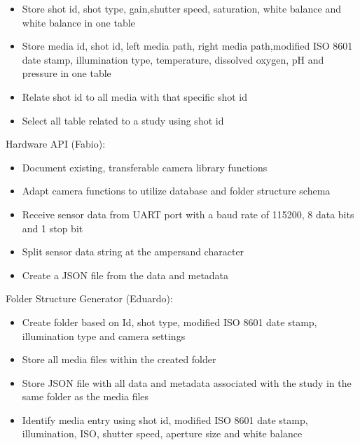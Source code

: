 \begin{itemize}
	\item Store shot id, shot type, gain,shutter speed, saturation, white balance and white balance in one table
	\item Store media id, shot id, left media path, right media path,modified ISO 8601 date stamp, illumination type, temperature, dissolved oxygen, pH and pressure in one table
	\item Relate shot id to all media with that specific shot id
	\item Select all table related to a study using shot id
\end{itemize}
Hardware API (Fabio):
\begin{itemize}
	\item Document existing, transferable camera library functions
	\item Adapt camera functions to utilize database and folder structure schema
	\item Receive sensor data from UART port with a baud rate of 115200, 8 data bits and 1 stop bit
	\item Split sensor data string at the ampersand character
	\item Create a JSON file from the data and metadata
\end{itemize}
Folder Structure Generator (Eduardo):
\begin{itemize}
	\item Create folder based on Id, shot type, modified ISO 8601 date stamp, illumination type and camera settings
	\item Store all media files within the created folder
	\item Store JSON file with all data and metadata associated with the study in the same folder as the media files
	\item Identify media entry using shot id, modified ISO 8601 date stamp, illumination, ISO, shutter speed, aperture size and white balance
\end{itemize}